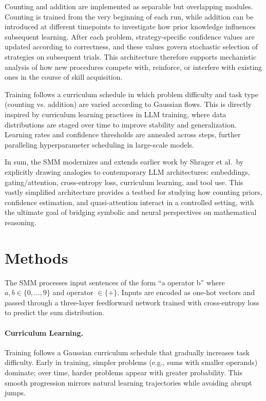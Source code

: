 \documentclass{article}
\begin{document}
Counting and addition are implemented as separable but overlapping modules. Counting is trained from the very beginning of each run, while addition can be introduced at different timepoints to investigate how prior knowledge influences subsequent learning. After each problem, strategy-specific confidence values are updated according to correctness, and these values govern stochastic selection of strategies on subsequent trials. This architecture
therefore supports mechanistic analysis of how new procedures compete with, reinforce, or interfere with existing ones in the course of skill acquisition.

Training follows a curriculum schedule in which problem difficulty and task type (counting vs. addition) are varied according to Gaussian flows. This is directly inspired by curriculum learning practices in LLM training, where data distributions are staged over time to improve stability and generalization. Learning rates and confidence thresholds are annealed across steps, further paralleling hyperparameter scheduling in large-scale models.

In sum, the SMM modernizes and extends earlier work by Shrager et al.\ by explicitly drawing analogies to contemporary LLM architectures: embeddings, gating/attention, cross-entropy loss, curriculum learning, and tool use. This vastly simplified architecture provides a testbed for studying how counting priors, confidence estimation, and quasi-attention interact in a controlled setting, with the ultimate goal of bridging symbolic and neural perspectives on mathematical reasoning.


\section{Methods}
The SMM processes input sentences of the form ``a operator b'' where $a,b \in \{0,\ldots,9\}$ and operator $\in \{+\}$. Inputs are encoded as one-hot vectors and passed through a three-layer feedforward network trained with cross-entropy loss to predict the sum distribution.

\paragraph{Curriculum Learning.} Training follows a Gaussian curriculum schedule that gradually increases task difficulty. Early in training, simpler problems (e.g., sums with smaller operands) dominate; over time, harder problems appear with greater probability. This smooth progression mirrors natural learning trajectories while avoiding abrupt jumps.
\end{document}

